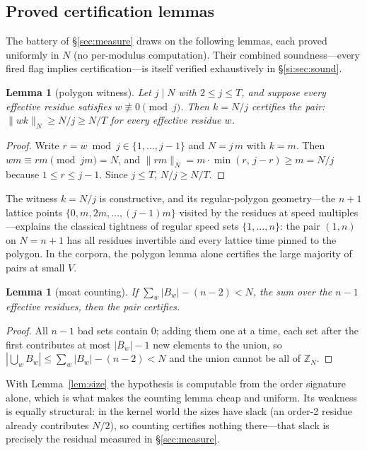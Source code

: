 \documentclass[11pt,a4paper]{article}
\numberwithin{equation}{section}
\theoremstyle{plain}
\theoremstyle{plain}
\newtheorem{lemma}[theorem]{Lemma}
\theoremstyle{definition}
\theoremstyle{remark}
\newcommand{\Z}{\mathbb{Z}}
\newcommand{\wn}[1]{\lVert #1 \rVert_{N}}
\begin{document}
\subsection{Proved certification lemmas}

The battery of \S\ref{sec:measure} draws on the following lemmas, each
proved uniformly in $N$ (no per-modulus computation). Their combined
soundness---every fired flag implies certification---is itself verified
exhaustively in \S\ref{si:sec:sound}.

\begin{lemma}[polygon witness]\label{lem:jgon}
Let $j\mid N$ with $2\le j\le T$, and suppose every effective residue
satisfies $w\not\equiv 0\pmod j$. Then $k=N/j$ certifies the pair:
$\wn{wk}\ge N/j\ge N/T$ for every effective residue $w$.
\end{lemma}

\begin{proof}
Write $r=w\bmod j\in\{1,\dots,j-1\}$ and $N=j\,m$ with $k=m$. Then
$wm\equiv rm\pmod{jm}=N$, and
$\wn{rm}=m\cdot\min(r,\,j-r)\ge m=N/j$ because
$1\le r\le j-1$. Since $j\le T$, $N/j\ge N/T$.
\end{proof}

The witness $k=N/j$ is constructive, and its regular-polygon
geometry---the $n{+}1$ lattice points $\{0,m,2m,\dots,(j{-}1)m\}$ visited
by the residues at speed multiples---explains the classical tightness of
regular speed sets $\{1,\dots,n\}$: the pair $(1,n)$ on $N=n+1$ has all
residues invertible and every lattice time pinned to the polygon. In the
corpora, the polygon lemma alone certifies the large majority of pairs at
small $V$.

\begin{lemma}[moat counting]\label{lem:counting}
If $\sum_w |B_w|-(n-2)<N$, the sum over the $n-1$ effective residues, then
the pair certifies.
\end{lemma}

\begin{proof}
All $n-1$ bad sets contain $0$; adding them one at a time, each set after
the first contributes at most $|B_w|-1$ new elements to the union, so
$|\bigcup_w B_w|\le \sum_w|B_w|-(n-2)<N$ and the union cannot be all of
$\Z_N$.
\end{proof}

With Lemma~\ref{lem:size} the hypothesis is computable from the order
signature alone, which is what makes the counting lemma cheap and uniform.
Its weakness is equally structural: in the kernel world the sizes have
slack (an order-2 residue already contributes $N/2$), so counting certifies
nothing there---that slack is precisely the residual measured in
\S\ref{sec:measure}.
\end{document}

